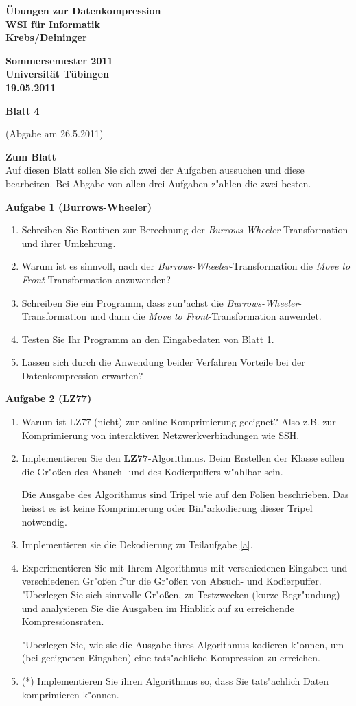 \documentclass[a4paper]{article}
\def\header#1#2#3#4{\pagestyle{empty}
\noindent
\begin{minipage}[t]{0.6\textwidth}
\begin{flushleft}
\bf \"Ubungen zur Datenkompression\\
WSI f\"ur Informatik\\
Krebs/Deininger
\end{flushleft}
\end{minipage}
\begin{minipage}[t]{0.4\textwidth}
\begin{flushright}
\bf Sommersemester 2011\\
Universit\"at T\"ubingen\\
#2 %
\end{flushright}
\end{minipage}

\begin{center}
{\Large\bf Blatt #1}

{(Abgabe am #3)}
\end{center}
}
\begin{document}
\header{4}{19.05.2011}{26.5.2011}{}

\bigskip

{\bf Zum Blatt}\\
Auf diesen Blatt sollen Sie sich zwei der Aufgaben aussuchen und diese
bearbeiten. Bei Abgabe von allen drei Aufgaben z"ahlen die zwei besten.

\bigskip

{\bf Aufgabe 1  \quad(Burrows-Wheeler) }\\
\begin{enumerate}
\item Schreiben Sie Routinen zur Berechnung der {\em Burrows-Wheeler}-Transformation und ihrer Umkehrung.
\item Warum ist es sinnvoll, nach der {\em Burrows-Wheeler}-Transformation die {\em Move to Front}-Transformation anzuwenden?
\item Schreiben Sie ein Programm, dass zun"achst die  {\em Burrows-Wheeler}-Transformation und dann die {\em Move to Front}-Transformation anwendet.
\item Testen Sie Ihr Programm an den Eingabedaten von Blatt 1.
\item Lassen sich durch die Anwendung beider Verfahren Vorteile bei der Datenkompression erwarten?
\end{enumerate}

\bigskip

{\bf Aufgabe 2  \quad(LZ77)}\\
\begin{enumerate}
\item Warum ist LZ77 (nicht) zur online Komprimierung geeignet? Also z.B. zur Komprimierung von interaktiven Netzwerkverbindungen wie SSH.
\item\label{a} Implementieren Sie den {\bf LZ77}-Algorithmus. Beim Erstellen der Klasse sollen die Gr"o{\ss}en des Absuch- und des Kodierpuffers w"ahlbar sein.

Die Ausgabe des Algorithmus sind Tripel wie auf den Folien beschrieben. Das heisst es ist keine Komprimierung oder Bin"arkodierung dieser Tripel notwendig.

\item Implementieren sie die Dekodierung zu Teilaufgabe \ref{a}.
\item Experimentieren Sie mit Ihrem Algorithmus mit verschiedenen Eingaben und verschiedenen Gr"o{\ss}en f"ur die Gr"o{\ss}en von Absuch- und Kodierpuffer. "Uberlegen Sie sich sinnvolle Gr"o{\ss}en, zu Testzwecken (kurze Begr"undung) und analysieren Sie die Ausgaben im Hinblick auf zu erreichende Kompressionsraten.

"Uberlegen Sie, wie sie die Ausgabe ihres Algorithmus kodieren k"onnen, um (bei geeigneten Eingaben) eine tats"achliche Kompression zu erreichen.

\item(*) Implementieren Sie ihren Algorithmus so, dass Sie tats"achlich Daten komprimieren k"onnen.
\end{enumerate}
\end{document}

